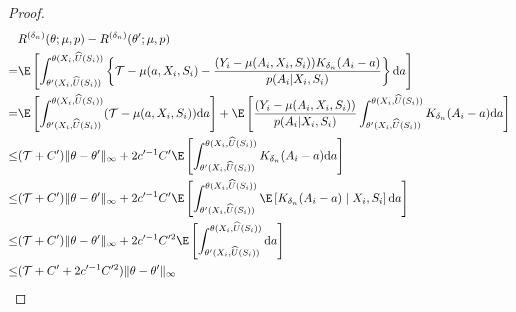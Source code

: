 \begin{proof}
\begin{align}
    & R^{({\delta_n})}(\theta;\mu,p) - R^{({\delta_n})}(\theta^\prime;\mu,p)\nonumber\\
    = & \E\left[\int_{\theta^\prime(X_i,\widehat U(S_i))}^{\theta(X_i,\widehat U(S_i))}\left\{\mathcal{T} -  \mu(a,X_i,S_i)- \frac{(Y_i - \mu(A_i,X_i,S_i))K_{\delta_n}(A_i-a)}{p(A_{i}|X_{i},S_{i})}\right\}\mathrm{d}a\right]\nonumber\\
    = & \E\left[\int_{\theta^\prime(X_i,\widehat U(S_i))}^{\theta(X_i,\widehat U(S_i))}(\mathcal{T} -  \mu(a,X_i,S_i))\mathrm{d}a\right]+ \E\left[\frac{(Y_i - \mu(A_i,X_i,S_i))}{p(A_{i}|X_{i},S_{i})}\int_{\theta^\prime(X_i,\widehat U(S_i))}^{\theta(X_i,\widehat U(S_i))}K_{\delta_n}(A_i-a)\mathrm{d}a\right]\nonumber\\
    \leq & (\mathcal{T}+C^\prime)\|\theta-\theta^\prime\|_{\infty} + 2c^{\prime-1}C^{\prime} \E\left[\int_{\theta^\prime(X_i,\widehat U(S_i))}^{\theta(X_i,\widehat U(S_i))}K_{\delta_n}(A_i-a)\mathrm{d}a\right]\nonumber\\
    \leq & (\mathcal{T}+C^\prime)\|\theta-\theta^\prime\|_{\infty} + 2c^{\prime-1}C^{\prime} \E\left[\int_{\theta^\prime(X_i,\widehat U(S_i))}^{\theta(X_i,\widehat U(S_i))}\E\left[K_{\delta_n}(A_i-a)\mid X_i,S_i\right]\mathrm{d}a\right]\nonumber\\
    \leq & (\mathcal{T}+C^\prime)\|\theta-\theta^\prime\|_{\infty} + 2c^{\prime-1}C^{\prime2} \E\left[\int_{\theta^\prime(X_i,\widehat U(S_i))}^{\theta(X_i,\widehat U(S_i))}\mathrm{d}a\right]\nonumber\\
    \leq & (\mathcal{T}+C^\prime+2c^{\prime-1}C^{\prime2})\|\theta-\theta^\prime\|_{\infty}\label{eq:lipschitz_to_theta_E}
\end{align}

\end{proof}


